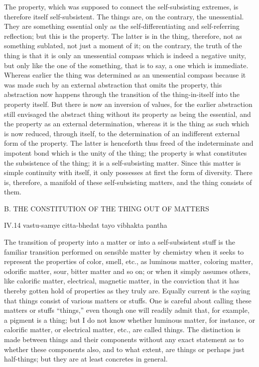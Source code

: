 The property, which was supposed to connect
the self-subsisting extremes,
is therefore itself self-subsistent.
The things are, on the contrary, the unessential.
They are something essential only as
the self-differentiating and self-referring reflection;
but this is the property.
The latter is in the thing,
therefore, not as something sublated, not just a moment of it;
on the contrary, the truth of the thing is
that it is only an unessential compass
which is indeed a negative unity,
but only like the one of the something,
that is to say, a one which is immediate.
Whereas earlier the thing was determined as
an unessential compass because it was made such
by an external abstraction that omits the property,
this abstraction now happens through the transition of
the thing-in-itself into the property itself.
But there is now an inversion of values,
for the earlier abstraction still envisaged the abstract thing
without its property as being the essential,
and the property as an external determination,
whereas it is the thing as such which is now reduced,
through itself, to the determination of
an indifferent external form of the property.
The latter is henceforth thus freed of the indeterminate
and impotent bond which is the unity of the thing;
the property is what constitutes the subsistence of the thing;
it is a self-subsisting matter.
Since this matter is simple continuity with itself,
it only possesses at first the form of diversity.
There is, therefore, a manifold of these self-subsisting matters,
and the thing consists of them.

B. THE CONSTITUTION OF THE THING OUT OF MATTERS

IV.14
vastu-samye citta-bhedat tayo vibhakta pantha

The transition of property into a matter or into a self-subsistent stuff is
the familiar transition performed on sensible matter by chemistry when
it seeks to represent the properties of color, smell, etc., as luminous matter,
coloring matter, odorific matter, sour, bitter matter and so on;
or when it simply assumes others, like calorific matter, electrical,
magnetic matter, in the conviction that it has thereby gotten hold of
properties as they truly are.
Equally current is the saying that things consist of various matters or stuffs.
One is careful about calling these matters or stuffs “things,”
even though one will readily admit that, for example, a pigment is a thing;
but I do not know whether luminous matter, for instance, or calorific matter,
or electrical matter, etc., are called things.
The distinction is made between things and their components without
any exact statement as to whether these components also,
and to what extent, are things or perhaps just half-things;
but they are at least concretes in general.

